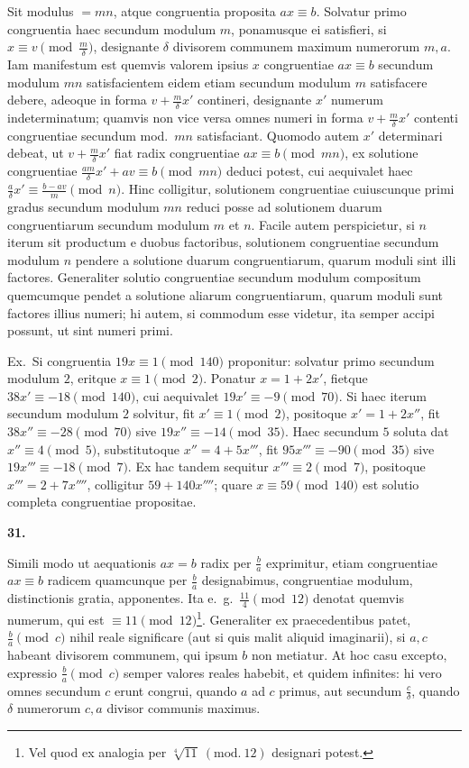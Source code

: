 \documentclass[12pt,a4paper]{article}
\theoremstyle{plain}
\theoremstyle{definition}
\theoremstyle{remark}
\begin{document}
Sit modulus $= mn$, atque congruentia proposita $ax \equiv b$. Solvatur primo congruentia haec secundum modulum $m$, ponamusque ei satisfieri, si $x \equiv v \pmod{\frac{m}{\delta}}$, designante $\delta$ divisorem communem maximum numerorum $m, a$. Iam manifestum est quemvis valorem ipsius $x$ congruentiae $ax \equiv b$ secundum modulum $mn$ satisfacientem eidem etiam secundum modulum $m$ satisfacere debere, adeoque in forma $v + \frac{m}{\delta}x'$ contineri, designante $x'$ numerum indeterminatum; quamvis non vice versa omnes numeri in forma $v + \frac{m}{\delta}x'$ contenti congruentiae secundum mod.\ $mn$ satisfaciant. Quomodo autem $x'$ determinari debeat, ut $v + \frac{m}{\delta}x'$ fiat radix congruentiae $ax \equiv b \pmod{mn}$, ex solutione congruentiae $\frac{am}{\delta}x' + av \equiv b \pmod{mn}$ deduci potest, cui aequivalet haec $\frac{a}{\delta}x' \equiv \frac{b - av}{m} \pmod{n}$. Hinc colligitur, solutionem congruentiae cuiuscunque primi gradus secundum modulum $mn$ reduci posse ad solutionem duarum congruentiarum secundum modulum $m$ et $n$. Facile autem perspicietur, si $n$ iterum sit productum e duobus factoribus, solutionem congruentiae secundum modulum $n$ pendere a solutione duarum congruentiarum, quarum moduli sint illi factores. Generaliter solutio congruentiae secundum modulum compositum quemcumque pendet a solutione aliarum congruentiarum, quarum moduli sunt factores illius numeri; hi autem, si commodum esse videtur, ita semper accipi possunt, ut sint numeri primi.

Ex.\ Si congruentia $19x \equiv 1 \pmod{140}$ proponitur: solvatur primo secundum modulum $2$, eritque $x \equiv 1 \pmod{2}$. Ponatur $x = 1 + 2x'$, fietque $38x' \equiv -18 \pmod{140}$, cui aequivalet $19x' \equiv -9 \pmod{70}$. Si haec iterum secundum modulum $2$ solvitur, fit $x' \equiv 1 \pmod{2}$, positoque $x' = 1 + 2x''$, fit $38x'' \equiv -28 \pmod{70}$ sive $19x'' \equiv -14 \pmod{35}$. Haec secundum $5$ soluta dat $x'' \equiv 4 \pmod{5}$, substitutoque $x'' = 4 + 5x'''$, fit $95x''' \equiv -90 \pmod{35}$ sive $19x''' \equiv -18 \pmod{7}$. Ex hac tandem sequitur $x''' \equiv 2 \pmod{7}$, positoque $x''' = 2 + 7x''''$, colligitur $59 + 140x''''$; quare $x \equiv 59 \pmod{140}$ est solutio completa congruentiae propositae.

\textbf{31.}

Simili modo ut aequationis $ax = b$ radix per $\frac{b}{a}$ exprimitur, etiam congruentiae $ax \equiv b$ radicem quamcunque per $\frac{b}{a}$ designabimus, congruentiae modulum, distinctionis gratia, apponentes. Ita e.~g.\ $\frac{11}{4} \pmod{12}$ denotat quemvis numerum, qui est $\equiv 11 \pmod{12}$\footnote{Vel quod ex analogia per $\sqrt[4]{11}\ (\text{mod.}\ 12)$ designari potest.}. Generaliter ex praecedentibus patet, $\frac{b}{a} \pmod{c}$ nihil reale significare (aut si quis malit aliquid imaginarii), si $a, c$ habeant divisorem communem, qui ipsum $b$ non metiatur. At hoc casu excepto, expressio $\frac{b}{a} \pmod{c}$ semper valores reales habebit, et quidem infinites: hi vero omnes secundum $c$ erunt congrui, quando $a$ ad $c$ primus, aut secundum $\frac{c}{\delta}$, quando $\delta$ numerorum $c, a$ divisor communis maximus.
\end{document}
